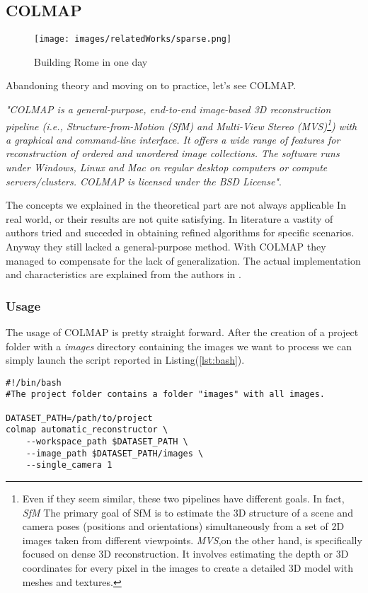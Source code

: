 \subsection{COLMAP}
\begin{figure}
    \centering
    \texttt{[image: images/relatedWorks/sparse.png]} %
    \caption{Building Rome in one day}
    \label{fig:colmap_image}
\end{figure}
Abandoning theory and moving on to practice, let's see COLMAP.

\textit{"COLMAP is a general-purpose, end-to-end image-based 
3D reconstruction pipeline (i.e., Structure-from-Motion (SfM)
 and Multi-View Stereo (MVS)\footnote{Even if they seem similar, these
 two pipelines have different goals. In fact, \textit{SfM} The
  primary goal of SfM is to estimate the 3D structure of 
  a scene and camera poses (positions and orientations) 
  simultaneously from a set of 2D images taken from different
   viewpoints. \textit{MVS},on the other hand, is specifically focused on dense 3D reconstruction. It involves estimating the depth or 3D coordinates 
   for every pixel in the images to create a detailed 3D model with
   meshes and textures.
}) with a graphical and command-line 
 interface. It offers a wide range of features for 
 reconstruction of ordered and unordered image collections. 
 The software runs under Windows, Linux and Mac on regular
  desktop computers or compute servers/clusters. COLMAP is
   licensed under the BSD License"}\cite{colmap}.

The concepts we explained in the theoretical part are not always applicable In
real world, or their results are not quite satisfying. In literature a vastity of authors
tried and succeded in obtaining refined algorithms for specific scenarios. 
Anyway they still lacked a general-purpose method. With COLMAP they managed
to compensate for the lack of generalization. The actual implementation and characteristics
are explained from the authors in \cite{schoenberger2016sfm,schoenberger2016mvs}.

\subsubsection{Usage}
The usage of COLMAP is pretty straight forward. After the creation of a project
folder with a \textit{images} directory containing the images we want to process we 
can simply launch the script reported in Listing(\ref{lst:bash}).
\begin{lstlisting}[style=vscode, caption={Automatic COLMAP Reconstruction}, label={lst:bash}]
#!/bin/bash
#The project folder contains a folder "images" with all images.

DATASET_PATH=/path/to/project
colmap automatic_reconstructor \
    --workspace_path $DATASET_PATH \
    --image_path $DATASET_PATH/images \
    --single_camera 1
    \end{lstlisting}

